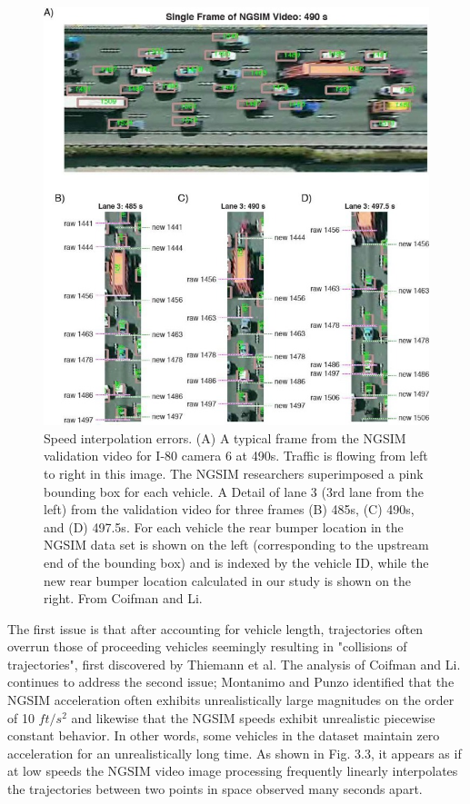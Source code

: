 \documentclass[11pt]{uonthesis}
\begin{document}
\begin{figure}[ht!]
    \centering
    \includegraphics[width=12cm]{interpolation.jpg}
    \caption{Speed interpolation errors. (A) A typical frame from the NGSIM validation video for I-80 camera 6 at 490s. Traffic is flowing from left to right in this image. The NGSIM researchers superimposed a pink bounding box for each vehicle. A Detail of lane 3 (3rd lane from the left) from the validation video for three frames (B) 485s, (C) 490s, and (D) 497.5s. For each vehicle the rear bumper location in the NGSIM data set is shown on the left (corresponding to the upstream end of the bounding box) and is indexed by the vehicle ID, while the new rear bumper location calculated in our study is shown on the right. From Coifman and Li.\protect\cite{COIFMAN2017362}}
\end{figure}

The first issue is that after accounting for vehicle length, trajectories often overrun those of proceeding vehicles seemingly resulting in "collisions of trajectories", first discovered by Thiemann et al.\cite{Thiemann_2008} The analysis of Coifman and Li. continues to address the second issue; Montanimo and Punzo\cite{MONTANINO201582} identified that the NGSIM acceleration often exhibits unrealistically large magnitudes on the order of 10 $ft/s^2$ and likewise that the NGSIM speeds exhibit unrealistic piecewise constant behavior. In other words, some vehicles in the dataset maintain zero acceleration for an unrealistically long time. As shown in Fig. 3.3, %
it appears as if at low speeds the NGSIM video image processing frequently linearly interpolates the trajectories between two points in space observed many seconds apart.
\end{document}
